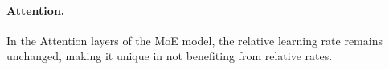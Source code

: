 \documentclass{article} %
\newcommand{\jl}[1]{\textcolor{green}{[JL: #1]}}
\begin{document}



    \paragraph{Attention.} In the Attention layers of the MoE model, the relative learning rate remains unchanged, making it unique in not benefiting from relative rates.

\end{document}
